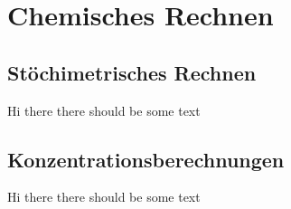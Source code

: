\section{Chemisches Rechnen}

\subsection{Stöchimetrisches Rechnen}

Hi there there should be some text

\subsection{Konzentrationsberechnungen}

Hi there there should be some text